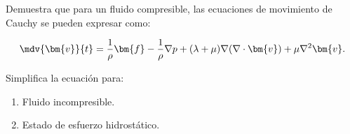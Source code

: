\documentclass[../main.tex]{subfiles}
\begin{document}
\begin{problema}
	Demuestra que para un fluido compresible, las ecuaciones de
	movimiento de Cauchy se pueden expresar como:

	\begin{equation*}
		\mdv{\bm{v}}{t} = \dfrac{1}{\rho}\bm{f} - \dfrac{1}{\rho}\nabla{p} +
		(\lambda + \mu)\nabla{(\nabla \cdot{\bm{v}})} + \mu \nabla^{2}{\bm{v}}.
	\end{equation*}

	Simplifica la ecuación para:

	\begin{enumerate}
		\item Fluido incompresible.
		\item Estado de esfuerzo hidrostático.
	\end{enumerate}
\end{problema}
\end{document}

